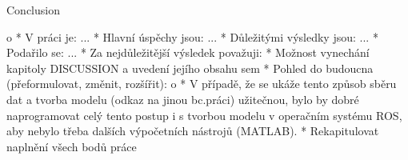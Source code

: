 \chap Conclusion

		\Green
		\begitems \style o
			* V práci je: ...
			* Hlavní úspěchy jsou: ...
			* Důležitými výsledky jsou: ...
			* Podařilo se: ...
			* Za nejdůležitější výsledek považuji:
			* Možnost vynechání kapitoly DISCUSSION a uvedení jejího obsahu sem
			* Pohled do budoucna (přeformulovat, změnit, rozšířit):
			\begitems \style o
				* V případě, že se ukáže tento způsob sběru dat a tvorba modelu (odkaz na jinou bc.práci) užitečnou, bylo by dobré naprogramovat celý tento postup i s tvorbou modelu v operačním systému ROS, aby nebylo třeba dalších výpočetních nástrojů (MATLAB).
			\enditems
			* Rekapitulovat naplnění všech bodů práce
		\enditems
		\Black



